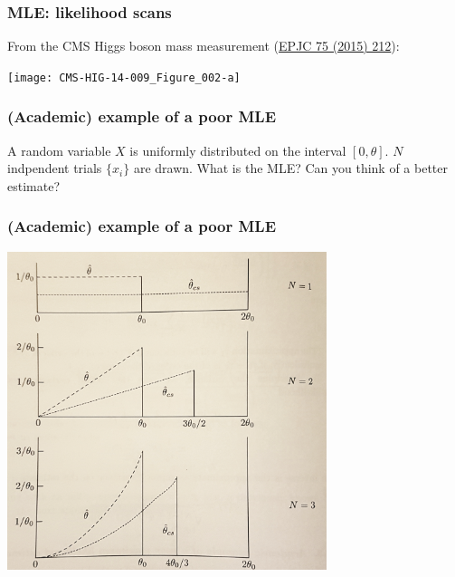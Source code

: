 \documentclass[9pt]{beamer}
\newif\ifmynote
\newcommand\mynote[1]{%
\ifmynote \textbf{#1} \else \fi
}
\begin{document}
\begin{frame}
 \frametitle{MLE: likelihood scans}
 
 From the CMS Higgs boson mass measurement (\href{http://cms-results.web.cern.ch/cms-results/public-results/publications/HIG-14-009/index.html}{EPJC 75 (2015) 212}):
 
 \begin{center}
  \texttt{[image: CMS-HIG-14-009\_Figure\_002-a]}
 \end{center}

\end{frame}



\begin{frame}
 \frametitle{(Academic) example of a poor MLE}
 
 \mynote{Exercise}
 
 \begin{exampleblock}{}
  A random variable $X$ is uniformly distributed on the interval $[0,\theta]$. $N$ indpendent trials $\{x_i\}$ are drawn. What is the MLE? Can you think of a better estimate?
 \end{exampleblock}
 
\end{frame}

\begin{frame}
 \frametitle{(Academic) example of a poor MLE}
 
 \begin{center}
  \includegraphics[width=0.7\textwidth]{academic_MLE.jpg}
 \end{center}

\end{frame}
\end{document}
